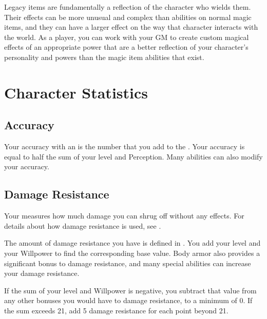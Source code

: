             Legacy items are fundamentally a reflection of the character who wields them.
            Their effects can be more unusual and complex than abilities on normal magic items, and they can have a larger effect on the way that character interacts with the world.
            As a player, you can work with your GM to create custom magical effects of an appropriate power that are a better reflection of your character's personality and powers than the magic item abilities that exist.

\section{Character Statistics}\label{Character Statistics}

    \subsection{Accuracy}\label{Accuracy}
        Your accuracy with an  is the number that you add to the .
        Your accuracy is equal to half the sum of your level and Perception.
        Many abilities can also modify your accuracy.

    \subsection{Damage Resistance}\label{Damage Resistance}
        Your  measures how much damage you can shrug off without any effects.
        For details about how damage resistance is used, see .

        The amount of damage resistance you have is defined in .
        You add your level and your Willpower to find the corresponding base value.
        Body armor also provides a significant bonus to damage resistance, and many special abilities can increase your damage resistance.

        If the sum of your level and Willpower is negative, you subtract that value from any other bonuses you would have to damage resistance, to a minimum of 0.
        If the sum exceeds 21, add 5 damage resistance for each point beyond 21.

